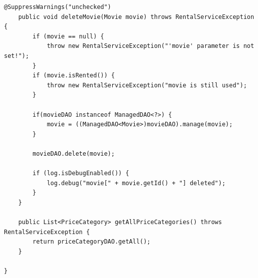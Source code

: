 \documentclass[a4paper,10pt]{scrreprt}
\begin{document}
\begin{lstlisting}[caption=MovieService]
	@SuppressWarnings("unchecked")
	public void deleteMovie(Movie movie) throws RentalServiceException {
		if (movie == null) {
			throw new RentalServiceException("'movie' parameter is not set!");
		}
		if (movie.isRented()) {
			throw new RentalServiceException("movie is still used");
		}

		if(movieDAO instanceof ManagedDAO<?>) {
			movie = ((ManagedDAO<Movie>)movieDAO).manage(movie);
		}

		movieDAO.delete(movie);
		
		if (log.isDebugEnabled()) {
			log.debug("movie[" + movie.getId() + "] deleted");
		}
	}

	public List<PriceCategory> getAllPriceCategories() throws RentalServiceException {
		return priceCategoryDAO.getAll();
	}

}

\end{lstlisting}
\end{document}
